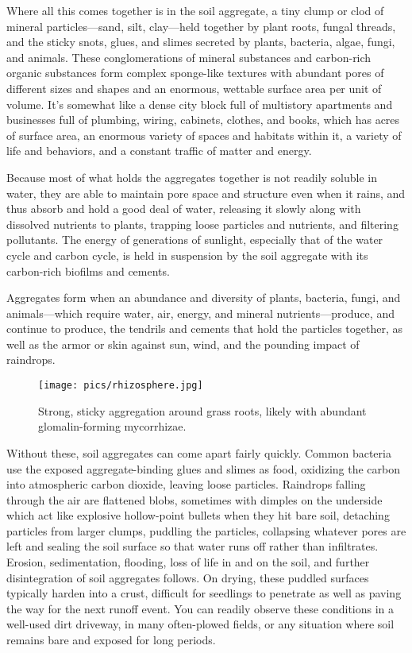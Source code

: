 \documentclass[11pt,letterpaper,twoside,onecolumn]{memoir}
\begin{document}
Where all this comes together is in the soil aggregate, a tiny clump or clod of mineral particles---sand, silt, clay---held together by plant roots, fungal threads, and the sticky snots, glues, and slimes secreted by plants, bacteria, algae, fungi, and animals. These conglomerations of mineral substances and carbon-rich organic substances form complex sponge-like textures with abundant pores of different sizes and shapes and an enormous, wettable surface area per unit of volume. It's somewhat like a dense city block full of multistory apartments and businesses full of plumbing, wiring, cabinets, clothes, and books, which has acres of surface area, an enormous variety of spaces and habitats within it, a variety of life and behaviors, and a constant traffic of matter and energy.

Because most of what holds the aggregates together is not readily soluble in water, they are able to maintain pore space and structure even when it rains, and thus absorb and hold a good deal of water, releasing it slowly along with dissolved nutrients to plants, trapping loose particles and nutrients, and filtering pollutants. The energy of generations of sunlight, especially that of the water cycle and carbon cycle, is held in suspension by the soil aggregate with its carbon-rich biofilms and cements.

Aggregates form when an abundance and diversity of plants, bacteria, fungi, and animals---which require water, air, energy, and mineral nutrients---produce, and continue to produce, the tendrils and cements that hold the particles together, as well as the armor or skin against sun, wind, and the pounding impact of raindrops. 

\begin{wrapfigure}{L}{6cm}
\texttt{[image: pics/rhizosphere.jpg]}
\caption*{Strong, sticky aggregation around grass roots, likely with abundant glomalin-forming mycorrhizae.}
\vspace{-1em}
\end{wrapfigure}

Without these, soil aggregates can come apart fairly quickly. Common bacteria use the exposed aggregate-binding glues and slimes as food, oxidizing the carbon into atmospheric carbon dioxide, leaving loose particles. Raindrops falling through the air are flattened blobs, sometimes with dimples on the underside which act like explosive hollow-point bullets when they hit bare soil, detaching particles from larger clumps, puddling the particles, collapsing whatever pores are left and sealing the soil surface so that water runs off rather than infiltrates. Erosion, sedimentation, flooding, loss of life in and on the soil, and further disintegration of soil aggregates follows. On drying, these puddled surfaces typically harden into a crust, difficult for seedlings to penetrate as well as paving the way for the next runoff event. You can readily observe these conditions in a well-used dirt driveway, in many often-plowed fields, or any situation where soil remains bare and exposed for long periods.
\end{document}
